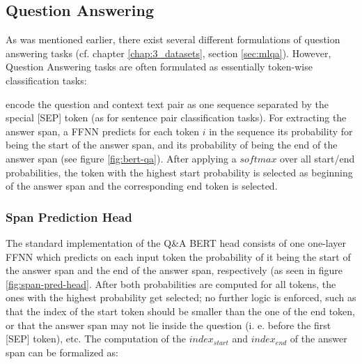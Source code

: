 \subsection{Question Answering}
\label{sec:question-answering}

As was mentioned earlier, there exist several different formulations of question answering tasks
(cf. chapter \ref{chap:3_datasets}, section \ref{sec:mlqa}). However, Question Answering tasks are
often formulated as essentially token-wise classification tasks:

\citeauthor{devlin2018bert} encode the question and context text pair as one sequence
separated by the special [SEP] token (as for sentence pair classification tasks). For
extracting the answer span, a FFNN predicts for each token $i$ in the sequence its
probability for being the start of the answer span, and its probability of being the
end of the answer span (see figure \ref{fig:bert-qa}). After applying a $softmax$ over
all start/end probabilities, the token with the highest start probability is selected
as beginning of the answer span and the corresponding end token is selected.



\subsubsection{Span Prediction Head}

The standard implementation of the Q\&A BERT head consists of one one-layer FFNN which predicts
on each input token the probability of it being the start of the answer span and the end of the
answer span, respectively (as seen in figure \ref{fig:span-pred-head}. After both probabilities are computed for all tokens, the ones with
the highest probability get selected; no further logic is enforced, such as that the index of
the start token should be smaller than the one of the end token, or that the answer span may
not lie inside the question (i. e. before the first [SEP] token), etc. The computation of the
$index_{start}$ and $index_{end}$ of the answer span can be formalized as:

